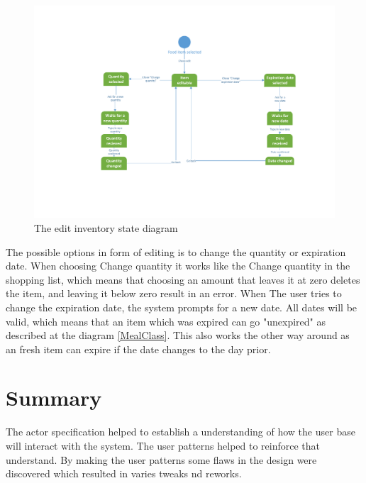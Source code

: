 \begin{figure}[H]
	\centering
	\includegraphics[width=1.0\textwidth]{ApplicationDomain/spEditInventory.pdf} 
	\caption{The edit inventory state diagram}
	\label{spEditInventory}
\end{figure}
The possible options in form of editing is to change the quantity or expiration date. 
When choosing Change quantity it works like the Change quantity in the shopping list, which means that choosing an amount that leaves it at zero deletes the item, and leaving it below zero result in an error. When The user tries to change the expiration date, the system prompts for a new date. All dates will be valid, which means that an item which was expired can go "unexpired" as described at the diagram \ref{MealClass}. This also works the other way around as an fresh item can expire if the date changes to the day prior.


\section*{Summary}
The actor specification helped to establish a understanding of how the user base will interact with the system. The user patterns helped to reinforce that understand. By making the user patterns some flaws in the design were discovered which resulted in varies tweaks nd reworks.